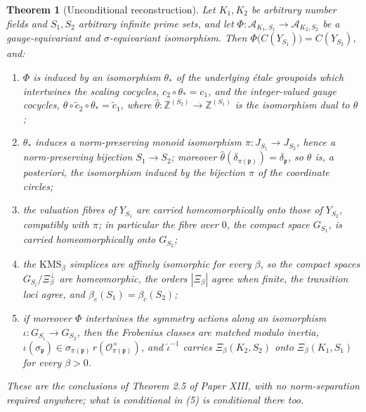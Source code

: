 \documentclass[11pt]{amsart}
\numberwithin{equation}{section}
\newtheorem{theorem}{Theorem}[section]
\theoremstyle{definition}
\theoremstyle{remark}
\newcommand{\Z}{\mathbb{Z}}
\newcommand{\cA}{\mathcal{A}}
\newcommand{\cO}{\mathcal{O}}
\newcommand{\pp}{\mathfrak{p}}
\begin{document}
\begin{theorem}[Unconditional reconstruction]\label{thm:uncond}
Let $K_1,K_2$ be arbitrary number fields and $S_1,S_2$ arbitrary infinite prime sets, and
let $\Phi:\cA_{K_1,S_1}\to\cA_{K_2,S_2}$ be a gauge-equivariant and $\sigma$-equivariant
isomorphism. Then $\Phi\bigl(C(Y_{S_1})\bigr)=C(Y_{S_2})$, and:
\begin{enumerate}
\item $\Phi$ is induced by an isomorphism $\theta_*$ of the underlying \'etale groupoids
which intertwines the scaling cocycles, $c_2\circ\theta_*=c_1$, and the integer-valued
gauge cocycles, $\widehat\theta\circ\widetilde c_2\circ\theta_*=\widetilde c_1$, where
$\widehat\theta:\Z^{(S_2)}\to\Z^{(S_1)}$ is the isomorphism dual to $\theta$;
\item $\theta_*$ induces a norm-preserving monoid isomorphism $\pi:J_{S_1}\to J_{S_2}$,
hence a norm-preserving bijection $S_1\to S_2$; moreover
$\widehat\theta(\delta_{\pi(\pp)})=\delta_\pp$, so $\theta$ is, a posteriori, the
isomorphism induced by the bijection $\pi$ of the coordinate circles;
\item the valuation fibres of $Y_{S_1}$ are carried homeomorphically onto those of
$Y_{S_2}$, compatibly with $\pi$; in particular the fibre over $0$, the compact space
$G_{S_1}$, is carried homeomorphically onto $G_{S_2}$;
\item the $\mathrm{KMS}_\beta$ simplices are affinely isomorphic for every $\beta$, so the
compact spaces $G_{S_i}/\Xi_\beta^\perp$ are homeomorphic, the orders $|\Xi_\beta|$ agree
when finite, the transition loci agree, and $\beta_c(S_1)=\beta_c(S_2)$;
\item if moreover $\Phi$ intertwines the symmetry actions along an isomorphism
$\iota:G_{S_1}\to G_{S_2}$, then the Frobenius classes are matched modulo inertia,
$\iota(\sigma_\pp)\in\sigma_{\pi(\pp)}\,r(\cO_{\pi(\pp)}^\times)$, and $\hat\iota^{-1}$
carries $\Xi_\beta(K_2,S_2)$ onto $\Xi_\beta(K_1,S_1)$ for every $\beta>0$.
\end{enumerate}
These are the conclusions of Theorem 2.5 of Paper XIII, with no norm-separation required
anywhere; what is conditional in (5) is conditional there too.
\end{theorem}
\end{document}
